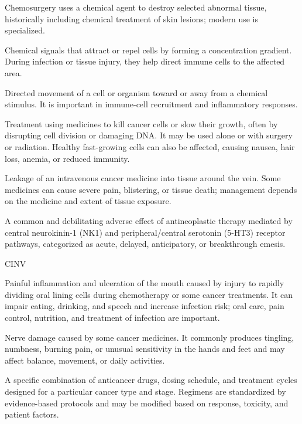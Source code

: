  Chemosurgery uses a chemical agent to destroy selected abnormal tissue, historically including chemical treatment of skin lesions; modern use is specialized.

 Chemical signals that attract or repel cells by forming a concentration gradient. During infection or tissue injury, they help direct immune cells to the affected area.

 Directed movement of a cell or organism toward or away from a chemical stimulus. It is
important in immune-cell recruitment and inflammatory responses.

 Treatment using medicines to kill cancer cells or slow their growth, often by disrupting cell division or damaging DNA. It may be used alone or with surgery or radiation. Healthy fast-growing cells can also be affected, causing nausea, hair loss, anemia, or reduced immunity.

 Leakage of an intravenous cancer medicine into tissue around the vein. Some medicines can cause severe pain, blistering, or tissue death; management depends on the medicine and extent of tissue exposure.

 A common and debilitating adverse effect of antineoplastic therapy mediated by central neurokinin-1 (NK1) and peripheral/central serotonin (5-HT3) receptor pathways, categorized as acute, delayed, anticipatory, or breakthrough emesis.

\synonyms
CINV

 Painful inflammation and ulceration of the mouth caused by injury to rapidly dividing oral lining cells during chemotherapy or some cancer treatments. It can impair eating, drinking, and speech and increase infection risk; oral care, pain control, nutrition, and treatment of infection are important.

 Nerve damage caused by some cancer medicines. It commonly produces tingling, numbness, burning pain, or unusual sensitivity in the hands and feet and may affect balance, movement, or daily activities.

 A specific combination of anticancer drugs, dosing schedule, and treatment cycles designed for a particular cancer type and stage. Regimens are standardized by evidence-based protocols and may be modified based on response, toxicity, and patient factors.

